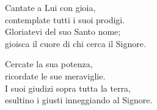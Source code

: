 
 

\spazio

\strofa Cantate a Lui con gioia,\\
contemplate tutti i suoi prodigi.\\
Gloriatevi del suo Santo nome;\\
gioisca il cuore di chi cerca il Signore.

\spazio


\spazio

\strofa Cercate la sua potenza,\\
ricordate le sue meraviglie.\\
I suoi giudizi sopra tutta la terra,\\
esultino i giusti inneggiando al Signore.

\spazio

 